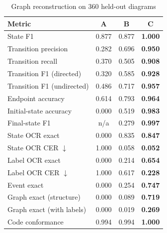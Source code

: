 \documentclass[journal,10pt]{IEEEtran}
\begin{document}
\begin{table}[t]
\centering
\caption{Graph reconstruction on 360 held-out diagrams}
\label{tab:ablation}
\footnotesize
\begin{tabular}{@{}lccc@{}}
\toprule
\textbf{Metric} & \textbf{A} & \textbf{B} & \textbf{C} \\
\midrule
State F1                    & 0.877 & 0.877 & \textbf{1.000} \\
Transition precision        & 0.282 & 0.696 & \textbf{0.950} \\
Transition recall           & 0.370 & 0.505 & \textbf{0.908} \\
Transition F1 (directed)    & 0.320 & 0.585 & \textbf{0.928} \\
Transition F1 (undirected)  & 0.486 & 0.717 & \textbf{0.957} \\
Endpoint accuracy           & 0.614 & 0.793 & \textbf{0.964} \\
Initial-state accuracy      & 0.000 & 0.519 & \textbf{0.983} \\
Final-state F1              & n/a   & 0.279 & \textbf{0.997} \\
\midrule
State OCR exact             & 0.000 & 0.835 & \textbf{0.847} \\
State OCR CER $\downarrow$  & 1.000 & 0.058 & \textbf{0.052} \\
Label OCR exact             & 0.000 & 0.214 & \textbf{0.654} \\
Label OCR CER $\downarrow$  & 1.000 & 0.617 & \textbf{0.228} \\
Event exact                 & 0.000 & 0.254 & \textbf{0.747} \\
\midrule
Graph exact (structure)     & 0.000 & 0.089 & \textbf{0.719} \\
Graph exact (with labels)   & 0.000 & 0.019 & \textbf{0.269} \\
Code conformance            & 0.994 & 0.994 & \textbf{1.000} \\
\bottomrule
\end{tabular}
\end{table}
\end{document}
